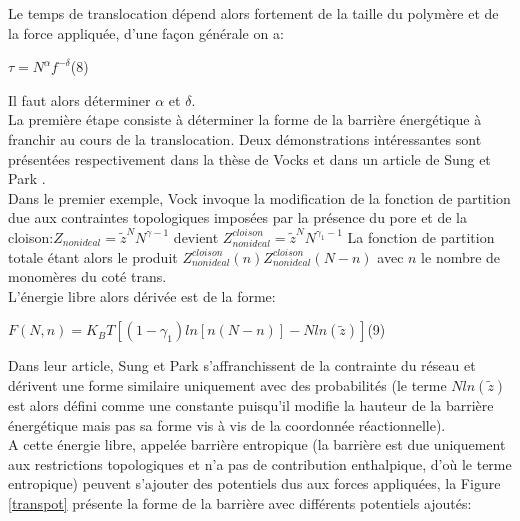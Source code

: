 \documentclass[a4paper,11pt]{article}
\begin{document}
Le temps de translocation dépend alors fortement de la taille du polymère et de la force appliquée, d'une façon générale on a:

\begin{center}

$\tau = N^\alpha f^{-\delta}$\flushright(8)

\end{center}

Il faut alors déterminer $\alpha$ et $\delta$.\\

La première étape consiste à déterminer la forme de la barrière énergétique à franchir au cours de la translocation. Deux démonstrations intéressantes sont présentées respectivement dans la thèse de Vocks \cite{these} et dans un article de Sung et Park \cite{sung}.\\

Dans le premier exemple, Vock invoque la modification de la fonction de partition due aux contraintes topologiques imposées par la présence du pore et de la cloison:\newline$Z_{non ideal} = \tilde{z}^N N^{\gamma-1}$ devient $Z^{cloison}_{non ideal} = \tilde{z}^N N^{\gamma_1-1}$ La fonction de partition totale étant alors le produit $Z^{cloison}_{non ideal}(n) Z^{cloison}_{non ideal}(N-n)$ avec $n$ le nombre de monomères du coté trans.\\

L'énergie libre alors dérivée est de la forme:

\begin{center}

$F(N,n) = K_B T [(1-\gamma_1)ln[n(N-n)] - Nln(\tilde{z})]$\flushright(9)

\end{center}

Dans leur article, Sung et Park \cite{sung} s'affranchissent de la contrainte du réseau et dérivent une forme similaire uniquement avec des probabilités (le terme $Nln(\tilde{z})$ est alors défini comme une constante puisqu'il modifie la hauteur de la barrière énergétique mais pas sa forme vis à vis de la coordonnée réactionnelle).\\

A cette énergie libre, appelée barrière entropique (la barrière est due uniquement aux restrictions topologiques et n'a pas de contribution enthalpique, d'où le terme entropique)  peuvent s'ajouter des potentiels dus aux forces appliquées, la Figure \ref{transpot} présente la forme de la barrière avec différents potentiels ajoutés:
\end{document}
